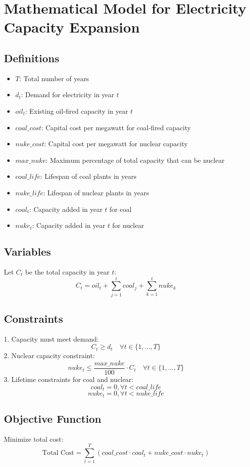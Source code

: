 \documentclass{article}
\begin{document}
\section*{Mathematical Model for Electricity Capacity Expansion}

\subsection*{Definitions}
\begin{itemize}
    \item \( T \): Total number of years
    \item \( d_t \): Demand for electricity in year \( t \)
    \item \( oil_t \): Existing oil-fired capacity in year \( t \)
    \item \( coal\_cost \): Capital cost per megawatt for coal-fired capacity
    \item \( nuke\_cost \): Capital cost per megawatt for nuclear capacity
    \item \( max\_nuke \): Maximum percentage of total capacity that can be nuclear
    \item \( coal\_life \): Lifespan of coal plants in years
    \item \( nuke\_life \): Lifespan of nuclear plants in years
    \item \( coal_t \): Capacity added in year \( t \) for coal
    \item \( nuke_t \): Capacity added in year \( t \) for nuclear
\end{itemize}

\subsection*{Variables}
Let \( C_t \) be the total capacity in year \( t \):
\[
C_t = oil_t + \sum_{j=1}^{t} coal_j + \sum_{k=1}^{t} nuke_k
\]

\subsection*{Constraints}
1. Capacity must meet demand:
\[
C_t \geq d_t \quad \forall t \in \{1, \ldots, T\}
\]
2. Nuclear capacity constraint:
\[
nuke_t \leq \frac{max\_nuke}{100} \cdot C_t \quad \forall t \in \{1, \ldots, T\}
\]
3. Lifetime constraints for coal and nuclear:
\[
coal_t = 0, \forall t < coal\_life
\]
\[
nuke_t = 0, \forall t < nuke\_life
\]

\subsection*{Objective Function}
Minimize total cost:
\[
\text{Total Cost} = \sum_{t=1}^{T} (coal\_cost \cdot coal_t + nuke\_cost \cdot nuke_t)
\]
\end{document}
